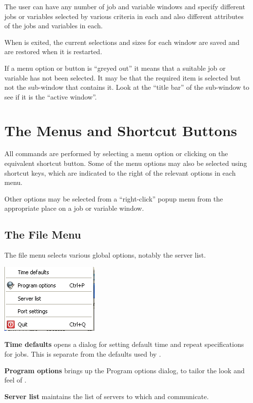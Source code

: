 The user can have any number of job and variable windows and specify different jobs or variables
selected by various criteria in each and also different attributes of the jobs and variables
in each.

When  is exited, the current selections and sizes for each window are saved
and are restored when it is restarted.

If a menu option or button is ``greyed out''
it means that a suitable job or variable has not been selected. It may
be that the required item is selected but not the sub-window that
contains it. Look at the ``title bar'' of the
sub-window to see if it is the ``active window''.

\section{The Menus and Shortcut Buttons}
All commands are performed by selecting a menu option or clicking on the
equivalent shortcut button. Some of the menu options may also be
selected using shortcut keys, which are indicated to the right of the
relevant options in each menu.

Other options may be selected from a ``right-click'' popup menu from the appropriate place
on a job or variable window.

\subsection{The File Menu}
The file menu selects various global options, notably the server list.

\includegraphics{img/btqwfilemenu.png} 

\textbf{Time defaults} opens a dialog for setting default time
and repeat specifications for jobs. This is separate from the defaults used by
.

\textbf{Program options} brings up the Program options dialog, to tailor
the look and feel of .

\textbf{Server list} maintains the list of servers to which 
and  communicate.

